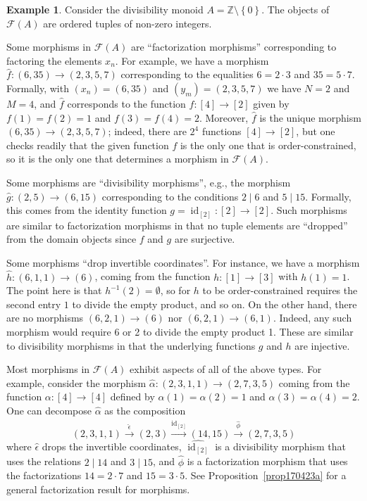 \documentclass[reqno]{amsart}
\theoremstyle{plain}
\theoremstyle{definition}
\newtheorem{ex}[lem]{Example}
\newcommand{\cat}[1]{\mathcal{#1}}
\newcommand{\catf}{\cat{F}}
\newcommand{\id}{\operatorname{id}}
\newcommand{\bbz}{\mathbb{Z}}
\newcommand{\xra}{\xrightarrow}
\numberwithin{equation}{lem}
\begin{document}
\begin{ex}\label{basic-example}
Consider the divisibility monoid $A = \bbz\setminus \left\{0\right\}$. 
The objects of $\mathcal{F}(A)$ are ordered tuples of non-zero integers. 

Some morphisms in $\mathcal{F}(A)$ are ``factorization morphisms'' corresponding to factoring the elements $x_n$.
For example, we have a morphism 
$\hat f\colon (6,35) \to (2,3,5,7)$ 
corresponding to the equalities $6 = 2\cdot 3$ and $35 = 5 \cdot 7$. 
Formally, with $(x_n)=(6,35)$ and $(y_m)=(2,3,5,7)$ we have $N=2$ and $M=4$, and $\hat f$ corresponds to the function
$f\colon [4]\to[2]$ given by $f(1) = f(2) = 1$ and $f(3) = f(4) = 2$.
Moreover, $\hat f$ is the unique morphism $(6,35) \to (2,3,5,7)$; indeed, there are $2^4$  functions $[4] \to [2]$, 
but one checks readily that 
the given
function $f$ is the only one that is
order-constrained, so it is the only one that determines a morphism in $\catf(A)$. 

Some morphisms are ``divisibility morphisms'',
e.g., the morphism  $\hat g\colon(2,5) \to (6,15)$ corresponding to the conditions 
$2 \mid 6$ and $5 \mid 15$. 
Formally, this comes from the identity function $g=\id_{[2]}\colon [2] \to [2]$. 
Such morphisms  
are similar to  factorization morphisms in that no tuple elements are ``dropped'' from the domain objects since $f$ and $g$ are surjective.

Some morphisms ``drop invertible coordinates''. For instance, we have a morphism $\hat h\colon(6,1,1) \to (6)$,
coming from the function $h\colon [1] \to [3]$ with $h(1) = 1$. 
The point here is that $h^{-1}(2)=\emptyset$, so for $h$ to be order-constrained
requires the second entry $1$ to divide the empty product, and so on.
On the other hand, 
there are no morphisms $(6,2,1)\to (6)$ nor $(6,2,1)\to(6,1)$. Indeed, any such morphism would require 6 or 2 to divide the empty product 1.
These are similar to divisibility morphisms in that the underlying functions $g$ and $h$ are injective.

Most morphisms in $\catf(A)$ exhibit aspects of all of the above  types. 
For example, consider the morphism 
$\widehat\alpha\colon(2,3,1,1) \to (2,7,3,5)$ coming
from the function $\alpha\colon[4] \to [4]$ defined by $\alpha(1)=\alpha(2)=1$ and $\alpha(3)=\alpha(4)=2$.
One can decompose $\widehat\alpha$ as the composition
\[(2,3,1,1) \xra{\hat\epsilon} (2,3) \xra{\widehat{\id_{[2]}}} (14,15) \xra{\hat\phi} (2,7,3,5)\]
where $\hat\epsilon$ drops the invertible coordinates, 
$\widehat{\id_{[2]}}$ is a divisibility morphism that uses the  relations $2 \mid 14$ and $3 \mid 15$, 
and $\hat\phi$ is a factorization morphism that uses
the factorizations $14=2\cdot 7$ and $15=3\cdot 5$. 
See Proposition~\ref{prop170423a} for a general factorization result for morphisms.
\end{ex}
\end{document}
